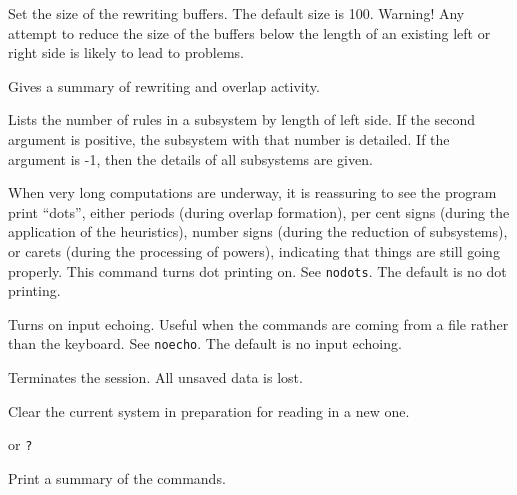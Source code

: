 \medskip
{}

\nobreak

Set the size of the rewriting buffers.  The default size is 100.
Warning!  Any attempt to reduce the size of the buffers below the
length of an existing left or right side is likely to lead to
problems.

\medskip
{}

\nobreak

Gives a summary of rewriting and overlap activity.

\medskip
{}

\nobreak

Lists the number of rules in a subsystem by length of left side.  If
the second argument is positive, the subsystem with that number is
detailed.  If the argument is -1, then the details of all subsystems
are given.

\medskip
{}

\nobreak

When very long computations are underway, it is reassuring to see the
program print ``dots'', either periods (during overlap formation), per
cent signs (during the application of the heuristics), number signs
(during the reduction of subsystems), or carets (during the processing
of powers), indicating that things are still going properly.  This
command turns dot printing on.  See {\tt nodots}.  The default is no
dot printing.

\medskip
{}

\nobreak

Turns on input echoing.  Useful when the commands are coming from a
file rather than the keyboard.  See {\tt noecho}.  The default is no
input echoing.

\medskip
{}

\nobreak

Terminates the session.  All unsaved data is lost.

\medskip
{}

\nobreak

Clear the current system in preparation for reading in a new one.

\medskip
{} or {\tt ?}

\nobreak

Print a summary of the commands.

\medskip
{}

